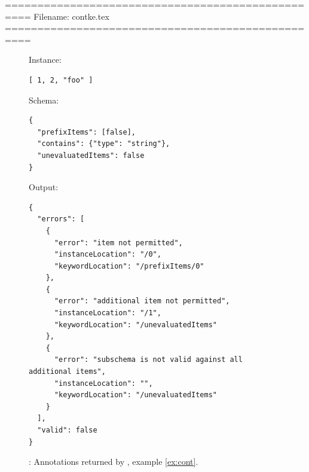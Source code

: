 ==================================================
Filename: contke.tex
==================================================
\begin{figure}
\small

Instance:
\begin{querybox}{}
\begin{lstlisting}[style=querynonumbers]
[ 1, 2, "foo" ]
\end{lstlisting}
\end{querybox}


Schema:
\begin{querybox}{}
\begin{lstlisting}[style=query]
{
  "prefixItems": [false],
  "contains": {"type": "string"},
  "unevaluatedItems": false
}
\end{lstlisting}
\end{querybox}

Output:
\begin{querybox}{}
\begin{lstlisting}[style=query]
{
  "errors": [
    {
      "error": "item not permitted",
      "instanceLocation": "/0",
      "keywordLocation": "/prefixItems/0"
    },
    {
      "error": "additional item not permitted",
      "instanceLocation": "/1",
      "keywordLocation": "/unevaluatedItems"
    },
    {
      "error": "subschema is not valid against all additional items",
      "instanceLocation": "",
      "keywordLocation": "/unevaluatedItems"
    }
  ],
  "valid": false
}
\end{lstlisting}
\end{querybox}

\caption{{\qcont}: Annotations returned by {\KE}, example \ref{ex:cont}.}
\label{fig:contje}
\end{figure}



